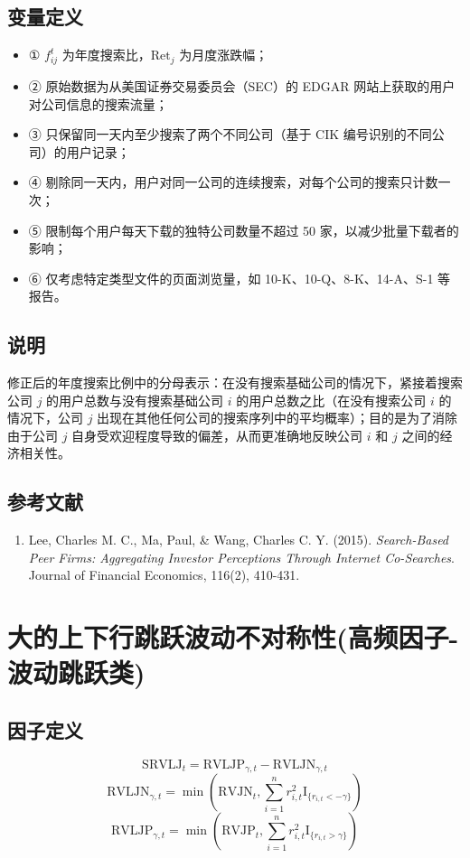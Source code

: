 \documentclass{article}
\begin{document}
\subsection{变量定义}
\begin{itemize}
    \item ① \( f_{ij}^t \) 为年度搜索比，\( \mathrm{Ret}_j \) 为月度涨跌幅；
    \item ② 原始数据为从美国证券交易委员会（SEC）的 EDGAR 网站上获取的用户对公司信息的搜索流量；
    \item ③ 只保留同一天内至少搜索了两个不同公司（基于 CIK 编号识别的不同公司）的用户记录；
    \item ④ 剔除同一天内，用户对同一公司的连续搜索，对每个公司的搜索只计数一次；
    \item ⑤ 限制每个用户每天下载的独特公司数量不超过 50 家，以减少批量下载者的影响；
    \item ⑥ 仅考虑特定类型文件的页面浏览量，如 10-K、10-Q、8-K、14-A、S-1 等报告。
\end{itemize}

\subsection{说明}
修正后的年度搜索比例中的分母表示：在没有搜索基础公司的情况下，紧接着搜索公司 \( j \) 的用户总数与没有搜索基础公司 \( i \) 的用户总数之比（在没有搜索公司 \( i \) 的情况下，公司 \( j \) 出现在其他任何公司的搜索序列中的平均概率）；目的是为了消除由于公司 \( j \) 自身受欢迎程度导致的偏差，从而更准确地反映公司 \( i \) 和 \( j \) 之间的经济相关性。

\subsection{参考文献}
\begin{enumerate}
    \item Lee, Charles M. C., Ma, Paul, \& Wang, Charles C. Y. (2015). \textit{Search-Based Peer Firms: Aggregating Investor Perceptions Through Internet Co-Searches}. Journal of Financial Economics, 116(2), 410-431.
\end{enumerate}

\section{大的上下行跳跃波动不对称性(高频因子-波动跳跃类)}

\subsection{因子定义}
\begin{equation}
    \mathrm{SRVLJ}_t = \mathrm{RVLJP}_{\gamma,t} - \mathrm{RVLJN}_{\gamma,t}
\end{equation}
\begin{equation}
    \mathrm{RVLJN}_{\gamma,t} = \min\left(\mathrm{RVJN}_t, \sum_{i=1}^n r_{i,t}^2 \mathrm{I}_{\{r_{i,t} < -\gamma\}}\right)
\end{equation}
\begin{equation}
    \mathrm{RVLJP}_{\gamma,t} = \min\left(\mathrm{RVJP}_t, \sum_{i=1}^n r_{i,t}^2 \mathrm{I}_{\{r_{i,t} > \gamma\}}\right)
\end{equation}
\end{document}
